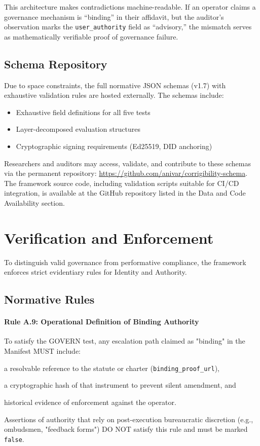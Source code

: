 \documentclass{article}
\begin{document}
This architecture makes contradictions machine-readable. If an operator claims a governance mechanism is ``binding'' in their affidavit, but the auditor's observation marks the \texttt{user\_authority} field as ``advisory,'' the mismatch serves as mathematically verifiable proof of governance failure.

\subsection{Schema Repository}

Due to space constraints, the full normative JSON schemas (v1.7) with exhaustive validation rules are hosted externally. The schemas include:

\begin{itemize}[noitemsep]
    \item Exhaustive field definitions for all five tests
    \item Layer-decomposed evaluation structures
    \item Cryptographic signing requirements (Ed25519, DID anchoring)
\end{itemize}

Researchers and auditors may access, validate, and contribute to these schemas via the permanent repository: \url{https://github.com/anivar/corrigibility-schema}. The framework source code, including validation scripts suitable for CI/CD integration, is available at the GitHub repository listed in the Data and Code Availability section.

\section{Verification and Enforcement}
\label{appendix:rules}

To distinguish valid governance from performative compliance, the framework enforces strict evidentiary rules for Identity and Authority.

\subsection{Normative Rules}

\paragraph{Rule A.9: Operational Definition of Binding Authority}
To satisfy the GOVERN test, any escalation path claimed as "binding" in the Manifest MUST include:
\begin{enumerate*}[label=(\roman*)]
    \item a resolvable reference to the statute or charter (\texttt{binding\_proof\_url}),
    \item a cryptographic hash of that instrument to prevent silent amendment, and
    \item historical evidence of enforcement against the operator.
\end{enumerate*}
Assertions of authority that rely on post-execution bureaucratic discretion (e.g., ombudsmen, "feedback forms") DO NOT satisfy this rule and must be marked \texttt{false}.
\end{document}
